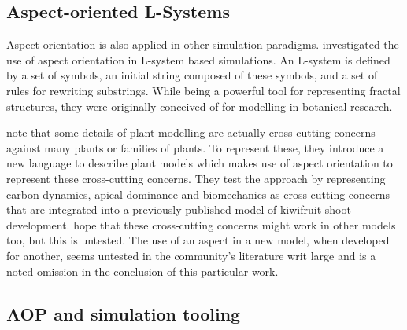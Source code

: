 \subsection{Aspect-oriented L-Systems}
Aspect-orientation is also applied in other simulation paradigms.
\citet{Cieslak_2011} investigated the use of aspect orientation in L-system
based simulations. An L-system\cite{lindenmayer1968lsystem} is defined by a set
of symbols, an initial string composed of these symbols, and a set of rules for
rewriting substrings. While being a powerful tool for representing fractal
structures, they were originally conceived of for modelling in botanical
research.

\citeauthor{Cieslak_2011} note that some details of plant modelling are actually
cross-cutting concerns against many plants or families of plants. To represent
these, they introduce a new language to describe plant models which makes use of
aspect orientation to represent these cross-cutting concerns. They test the
approach by representing carbon dynamics, apical dominance and biomechanics as
cross-cutting concerns that are integrated into a previously published model of
kiwifruit shoot development. \citeauthor{Cieslak_2011} hope that these
cross-cutting concerns might work in other models too, but this is untested. The
use of an aspect in a new model, when developed for another, seems untested in
the community's literature writ large and is a noted omission in the conclusion
of this particular work.



\subsection{AOP and simulation tooling}

